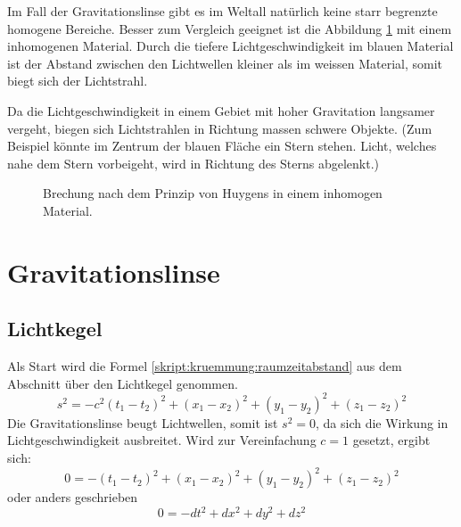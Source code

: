 \begin{refsection}
Im Fall der Gravitationslinse gibt es im Weltall natürlich keine starr
begrenzte homogene Bereiche.  Besser zum Vergleich geeignet ist die
Abbildung \ref{fig:huygens3} mit einem inhomogenen Material.  Durch
die tiefere Lichtgeschwindigkeit im blauen Material ist der Abstand
zwischen den Lichtwellen kleiner als im weissen Material, somit biegt
sich der Lichtstrahl.

Da die Lichtgeschwindigkeit in einem Gebiet mit hoher Gravitation
langsamer vergeht, biegen sich Lichtstrahlen in Richtung massen
schwere Objekte.  (Zum Beispiel könnte im Zentrum der blauen Fläche
ein Stern stehen.  Licht, welches nahe dem Stern vorbeigeht, wird in
Richtung des Sterns abgelenkt.)

\begin{figure}
  \centering
  
  \caption{Brechung nach dem Prinzip von Huygens in einem inhomogen
    Material.}
  \label{fig:huygens3}
\end{figure}


\section{Gravitationslinse}

\subsection{Lichtkegel}
Als Start wird die Formel \ref{skript:kruemmung:raumzeitabstand} aus
dem Abschnitt über den Lichtkegel genommen.
\begin{equation*}
  s^2 = -c^2 (t_1-t_2)^2 + (x_1-x_2)^2 + (y_1-y_2)^2 + (z_1-z_2)^2
\end{equation*}
Die Gravitationslinse beugt Lichtwellen, somit ist \(s^2=0\), da sich
die Wirkung in Lichtgeschwindigkeit ausbreitet.  Wird zur
Vereinfachung \(c=1\) gesetzt, ergibt sich:
\begin{equation*}
  0 = -(t_1-t_2)^2 + (x_1-x_2)^2 + (y_1-y_2)^2 + (z_1-z_2)^2
\end{equation*}
oder anders geschrieben
\begin{equation*}
  0 = -dt^2 + dx^2 + dy^2 + dz^2
\end{equation*}


\end{refsection}
